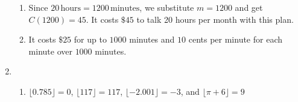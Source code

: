 \begin{enumerate}
\begin{enumerate}
\item  Since $20 \, \text{hours} = 1200 \, \text{minutes}$, we substitute $m = 1200$ and get  $C(1200) = 45$.  It costs $\$ 45$ to talk 20 hours per month with this plan. 

\item It costs $\$25$ for up to $1000$ minutes and $10$ cents per minute for each minute over $1000$ minutes.
 
\end{enumerate}

\item \begin{enumerate}

\item  $\lfloor 0.785 \rfloor = 0$, $\lfloor 117 \rfloor = 117$, $\lfloor -2.001 \rfloor = -3$, and $\lfloor \pi + 6 \rfloor = 9$

\end{enumerate}

\end{enumerate}

\closegraphsfile